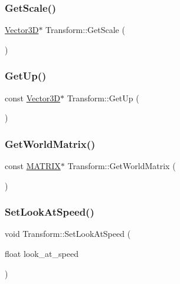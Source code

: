 \subsubsection{\texorpdfstring{Get\+Scale()}{GetScale()}}
{\footnotesize\ttfamily \mbox{\hyperlink{class_vector3_d}{Vector3D}}$\ast$ Transform\+::\+Get\+Scale (\begin{DoxyParamCaption}{ }\end{DoxyParamCaption})\hspace{0.3cm}{\ttfamily [inline]}}

\mbox{\label{class_transform_a9f5700481ae42556f763726947feaf36}} 
\subsubsection{\texorpdfstring{Get\+Up()}{GetUp()}}
{\footnotesize\ttfamily const \mbox{\hyperlink{class_vector3_d}{Vector3D}}$\ast$ Transform\+::\+Get\+Up (\begin{DoxyParamCaption}{ }\end{DoxyParamCaption})\hspace{0.3cm}{\ttfamily [inline]}}

\mbox{\label{class_transform_a060f9487a18ad34549eab53a7ca5100d}} 
\subsubsection{\texorpdfstring{Get\+World\+Matrix()}{GetWorldMatrix()}}
{\footnotesize\ttfamily const \mbox{\hyperlink{_vector3_d_8h_a032295cd9fb1b711757c90667278e744}{M\+A\+T\+R\+IX}}$\ast$ Transform\+::\+Get\+World\+Matrix (\begin{DoxyParamCaption}{ }\end{DoxyParamCaption})\hspace{0.3cm}{\ttfamily [inline]}}

\mbox{\label{class_transform_ab6f7342cb4eca555c02a85c999d499dc}} 
\subsubsection{\texorpdfstring{Set\+Look\+At\+Speed()}{SetLookAtSpeed()}}
{\footnotesize\ttfamily void Transform\+::\+Set\+Look\+At\+Speed (\begin{DoxyParamCaption}\item[{float}]{look\+\_\+at\+\_\+speed }\end{DoxyParamCaption})\hspace{0.3cm}{\ttfamily [inline]}}

